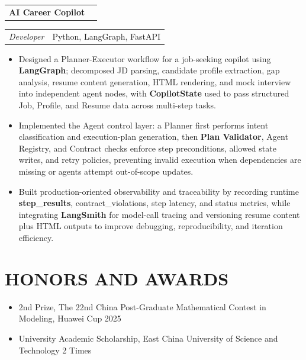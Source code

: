 \documentclass[a4paper,12pt]{article}
\makeatletter
\newcommand{\resumeProjectTitle}[2]{
  \begin{tabular*}{\textwidth}{l@{\extracolsep{\fill}}r}
    \textbf{#1} & {#2}
  \end{tabular*}
}
\newcommand{\resumeProjectSubTitle}[2]{
  \begin{tabular*}{\textwidth}{l@{\extracolsep{\fill}}r}
    \emph{#1} & {#2}
  \end{tabular*}
}
\newcommand{\resumeItemListStart}{\begin{itemize}[leftmargin=*]}
\newcommand{\resumeItemListEnd}{\end{itemize}}
\newcommand{\resumeItem}[1]{\item{#1}}
\makeatother
\begin{document}
\resumeProjectTitle{AI Career Copilot}{}
\resumeProjectSubTitle{Developer}{Python, LangGraph, FastAPI}
\resumeItemListStart
\resumeItem{Designed a Planner-Executor workflow for a job-seeking copilot using \textbf{LangGraph}; decomposed JD parsing, candidate profile extraction, gap analysis, resume content generation, HTML rendering, and mock interview into independent agent nodes, with \textbf{CopilotState} used to pass structured Job, Profile, and Resume data across multi-step tasks.}
\resumeItem{Implemented the Agent control layer: a Planner first performs intent classification and execution-plan generation, then \textbf{Plan Validator}, Agent Registry, and Contract checks enforce step preconditions, allowed state writes, and retry policies, preventing invalid execution when dependencies are missing or agents attempt out-of-scope updates.}
\resumeItem{Built production-oriented observability and traceability by recording runtime \textbf{step\_results}, contract\_violations, step latency, and status metrics, while integrating \textbf{LangSmith} for model-call tracing and versioning resume content plus HTML outputs to improve debugging, reproducibility, and iteration efficiency.}
\resumeItemListEnd
\vspace{0.5em}

\section{HONORS AND AWARDS}
\resumeItemListStart
    \resumeItem{2nd Prize, The 22nd China Post-Graduate Mathematical Contest in Modeling, Huawei Cup \hfill 2025}
  \resumeItem{University Academic Scholarship, East China University of Science and Technology \hfill 2 Times}
\resumeItemListEnd
\end{document}
